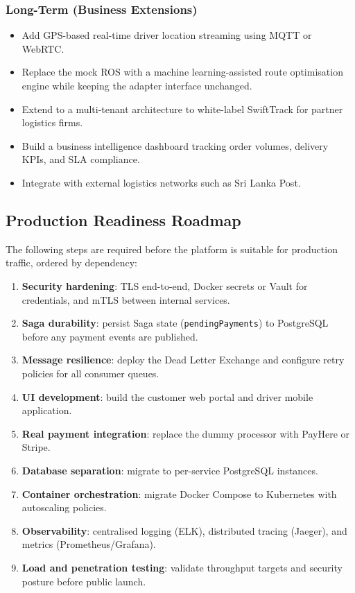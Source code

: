 \subsubsection{Long-Term (Business Extensions)}
\begin{itemize}
  \item Add GPS-based real-time driver location streaming using MQTT or WebRTC.
  \item Replace the mock ROS with a machine learning-assisted route optimisation
        engine while keeping the adapter interface unchanged.
  \item Extend to a multi-tenant architecture to white-label SwiftTrack for
        partner logistics firms.
  \item Build a business intelligence dashboard tracking order volumes, delivery
        KPIs, and SLA compliance.
  \item Integrate with external logistics networks such as Sri Lanka Post.
\end{itemize}

\subsection{Production Readiness Roadmap}

The following steps are required before the platform is suitable for production traffic,
ordered by dependency:

\begin{enumerate}
  \item \textbf{Security hardening}: TLS end-to-end, Docker secrets or Vault for
        credentials, and mTLS between internal services.
  \item \textbf{Saga durability}: persist Saga state (\texttt{pendingPayments})
        to PostgreSQL before any payment events are published.
  \item \textbf{Message resilience}: deploy the Dead Letter Exchange and configure
        retry policies for all consumer queues.
  \item \textbf{UI development}: build the customer web portal and driver
        mobile application.
  \item \textbf{Real payment integration}: replace the dummy processor with
        PayHere or Stripe.
  \item \textbf{Database separation}: migrate to per-service PostgreSQL instances.
  \item \textbf{Container orchestration}: migrate Docker Compose to Kubernetes
        with autoscaling policies.
  \item \textbf{Observability}: centralised logging (ELK), distributed tracing
        (Jaeger), and metrics (Prometheus/Grafana).
  \item \textbf{Load and penetration testing}: validate throughput targets and
        security posture before public launch.
\end{enumerate}

